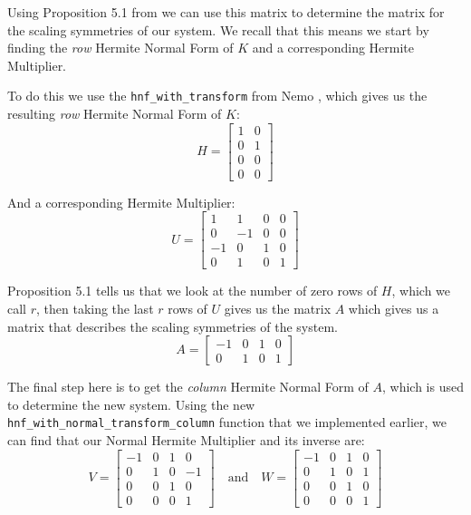 \documentclass[oneside, a4paper, onecolumn, 11pt]{article}
\begin{document}
Using Proposition 5.1 from \cite{Hubert2013} we can use this matrix to determine the matrix for the scaling symmetries of our system. We recall that this means we start by finding the \textit{row} Hermite Normal Form of \(K\) and a corresponding Hermite Multiplier.


To do this we use the \texttt{hnf\_with\_transform} from Nemo \cite{nemo}, which gives us the resulting \textit{row} Hermite Normal Form of \(K\):
\[
    H = \begin{bmatrix}
        1 & 0 \\
        0 & 1 \\
        0 & 0 \\
        0 & 0
    \end{bmatrix}
\]

And a corresponding Hermite Multiplier:
\[
    U = \begin{bmatrix}
        1  & 1  & 0 & 0 \\
        0  & -1 & 0 & 0 \\
        -1 & 0  & 1 & 0 \\
        0  & 1  & 0 & 1
    \end{bmatrix}
\]

Proposition 5.1 tells us that we look at the number of zero rows of \(H\), which we call \(r\), then taking the last \(r\) rows of \(U\) gives us the matrix \(A\) which gives us a matrix that describes the scaling symmetries of the system.
\[
    A = \begin{bmatrix}
        -1 & 0 & 1 & 0 \\
        0  & 1 & 0 & 1
    \end{bmatrix}
\]


The final step here is to get the \textit{column} Hermite Normal Form of \(A\), which is used to determine the new system. Using the new \texttt{hnf\_with\_normal\_transform\_column} function that we implemented earlier, we can find that our Normal Hermite Multiplier and its inverse are:
\[
    V = \begin{bmatrix}
        -1 & 0 & 1 & 0  \\
        0  & 1 & 0 & -1 \\
        0  & 0 & 1 & 0  \\
        0  & 0 & 0 & 1
    \end{bmatrix}
    \quad \text{and} \quad
    W = \begin{bmatrix}
        -1 & 0 & 1 & 0 \\
        0  & 1 & 0 & 1 \\
        0  & 0 & 1 & 0 \\
        0  & 0 & 0 & 1
    \end{bmatrix}
\]
\end{document}
